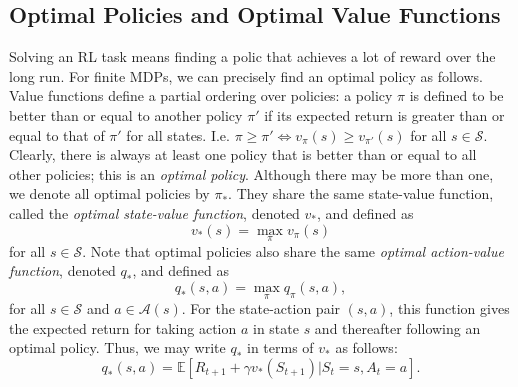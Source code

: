 \documentclass[12pt]{article}
\begin{document}
\subsection{Optimal Policies and Optimal Value Functions} Solving an RL task means finding a polic that achieves a lot of reward over the long run. For finite MDPs, we can precisely find an optimal policy as follows. Value functions define a partial ordering over policies: a policy $\pi$ is defined to be better than or equal to another policy $\pi'$ if its expected return is greater than or equal to that of $\pi'$ for all states. I.e. $\pi \geq \pi' \iff v_\pi(s) \geq v_{\pi'}(s)$ for all $s \in \mathcal S$. Clearly, there is always at least one policy that is better than or equal to all other policies; this is an \emph{optimal policy}. Although there may be more than one, we denote all optimal policies by $\pi_*$. They share the same state-value function, called the \emph{optimal state-value function}, denoted $v_*$, and defined as
\[
  v_*(s) = \max_\pi v_\pi(s)
\]
for all $s \in \mathcal S$. Note that optimal policies also share the same \emph{optimal action-value function}, denoted $q_*$, and defined as
\[
  q_*(s,a) = \max_\pi q_\pi(s,a),
\]
for all $s \in \mathcal S$ and $a \in \mathcal A(s)$. For the state-action pair $(s,a)$, this function gives the expected return for taking action $a$ in state $s$ and thereafter following an optimal policy. Thus, we may write $q_*$ in terms of $v_*$ as follows:
\[
  q_*(s,a) = \mathbb E \left[ R_{t+1} + \gamma v_*(S_{t+1}) | S_t = s, A_t = a \right].
\]
\end{document}
